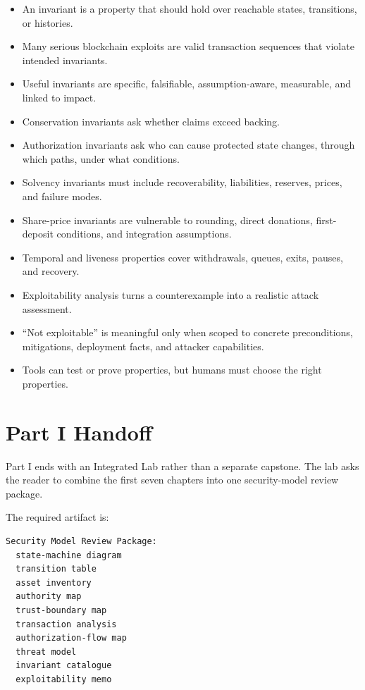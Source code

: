 \begin{itemize}
\tightlist
\item
  An invariant is a property that should hold over reachable states,
  transitions, or histories.
\item
  Many serious blockchain exploits are valid transaction sequences that
  violate intended invariants.
\item
  Useful invariants are specific, falsifiable, assumption-aware,
  measurable, and linked to impact.
\item
  Conservation invariants ask whether claims exceed backing.
\item
  Authorization invariants ask who can cause protected state changes,
  through which paths, under what conditions.
\item
  Solvency invariants must include recoverability, liabilities,
  reserves, prices, and failure modes.
\item
  Share-price invariants are vulnerable to rounding, direct donations,
  first-deposit conditions, and integration assumptions.
\item
  Temporal and liveness properties cover withdrawals, queues, exits,
  pauses, and recovery.
\item
  Exploitability analysis turns a counterexample into a realistic attack
  assessment.
\item
  ``Not exploitable'' is meaningful only when scoped to concrete
  preconditions, mitigations, deployment facts, and attacker
  capabilities.
\item
  Tools can test or prove properties, but humans must choose the right
  properties.
\end{itemize}

\section{Part I Handoff}

Part I ends with an Integrated Lab rather than a separate capstone. The lab asks the reader to combine the first seven chapters into one security-model review package.

The required artifact is:

\begin{lstlisting}
Security Model Review Package:
  state-machine diagram
  transition table
  asset inventory
  authority map
  trust-boundary map
  transaction analysis
  authorization-flow map
  threat model
  invariant catalogue
  exploitability memo
\end{lstlisting}

